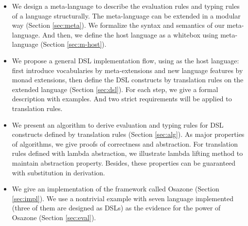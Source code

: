\begin{itemize}
  \item We design a meta-language to describe the evaluation rules and typing rules of a language structurally.
    The meta-language can be extended in a modular way (Section \ref{sec:meta}).
    We formalize the syntax and semantics of our meta-language.
    And then, we define the host language \STLC{} as a whitebox using meta-language (Section \ref{sec:m-host}).
  \item We propose a general DSL implementation flow, using \STLC{} as the host language:
    first introduce vocabularies by meta-extensions and new language features by monad extensions,
    then define the DSL constructs by translation rules on the extended language (Section \ref{sec:dsl}). 
    For each step, we give a formal description with examples.
    And two strict requirements will be applied to translation rules.
  \item We present an algorithm to derive evaluation and typing rules for DSL constructs defined by translation rules (Section \ref{sec:alg}).
    As major properties of algorithms, we give proofs of correctness and abstraction. 
    For translation rules defined with lambda abstraction,
     we illustrate lambda lifting method to maintain abstraction property.
    Besides, these properties can be guaranteed with substitution in derivation.
  \item We give an implementation of the framework called Osazone (Section \ref{sec:impl}).
    We use a nontrivial example with seven language implemented (three of them are designed as DSLs) as the evidence for the power of Osazone (Section \ref{sec:eval}).
\end{itemize}

